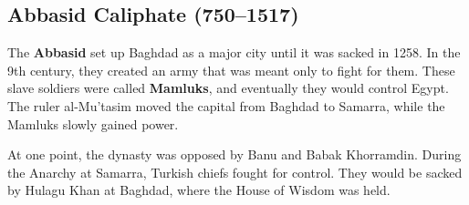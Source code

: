 \subsection*{Abbasid Caliphate (750--1517)}

The \textbf{Abbasid} set up Baghdad as a major city until it was sacked in 1258.
In the 9th century, they created an army that was meant only to fight for them.
These slave soldiers were called \textbf{Mamluks}, and eventually they would control Egypt.
The ruler al-Mu'tasim moved the capital from Baghdad to Samarra, while the Mamluks slowly gained power.

At one point, the dynasty was opposed by Banu and Babak Khorramdin.
During the Anarchy at Samarra, Turkish chiefs fought for control.
They would be sacked by Hulagu Khan at Baghdad, where the House of Wisdom was held.
